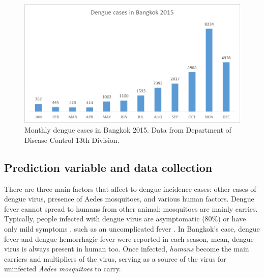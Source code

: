 \documentclass[review]{elsarticle}
\begin{document}
\begin{figure}[htbp]
	\begin{center}
		\includegraphics[width=120mm]{./figures/dengue_bangkok_2015}
		\caption{ Monthly dengue cases in Bangkok  2015. Data from Department of Disease Control 13th Division. }
		\label{figure-dengue_bangkok_2015}
	\end{center}
\end{figure}




\subsection{Prediction variable and data collection}
\label{section-Prediction-variable}

There are three main factors that affect to dengue incidence cases: other cases of dengue virus, presence of Aedes mosquitoes, and various human factors. Dengue fever cannot spread to humans from other animal; mosquitoes are mainly carries. Typically, people infected with dengue virus are asymptomatic (80\%) or have only mild symptoms , such as an uncomplicated fever \cite{whitehorn2010dengue,reiter2010yellow}. In Bangkok's case, dengue fever and dengue hemorrhagic fever were reported in each season,  mean, dengue virus  is always present in human too. Once infected, \textit{humans} become the main carriers and multipliers of the virus, serving as a source of the virus for uninfected \textit{Aedes mosquitoes} to carry. 
\end{document}
